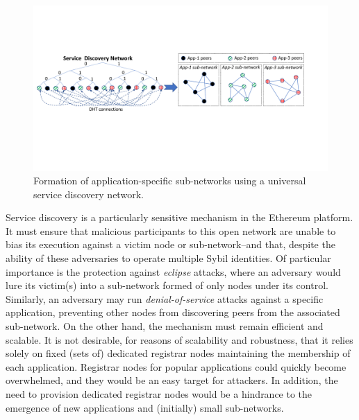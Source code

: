 \begin{figure}[b!]
    \includegraphics[width=1\linewidth]{img/subnetwork}
    \vspace{-0.15in}
    \caption{Formation of application-specific sub-networks using a universal service discovery network.
    \protect{}
    }
    \label{fig:subnetwork}
    \vspace{-0.15in}
\end{figure}

Service discovery is a particularly sensitive mechanism in the Ethereum platform.
It must ensure that malicious participants to this open network are unable to bias its execution against a victim node or sub-network--and that, despite the ability of these adversaries to operate multiple Sybil identities.
Of particular importance is the protection against \emph{eclipse} attacks, where an adversary would lure its victim(s) into a sub-network formed of only nodes under its control.
Similarly, an adversary may run \emph{denial-of-service} attacks against a specific application, preventing other nodes from discovering peers from the associated sub-network.
On the other hand, the mechanism must remain efficient and scalable.
It is not desirable, for reasons of scalability and robustness, that it relies solely on fixed (sets of) dedicated registrar nodes maintaining the membership of each application.
Registrar nodes for popular applications could quickly become overwhelmed, and they would be an easy target for attackers.
In addition, the need to provision dedicated registrar nodes would be a hindrance to the emergence of new applications and (initially) small sub-networks.


